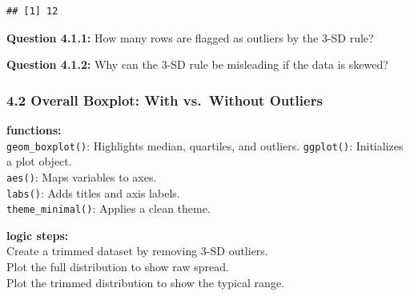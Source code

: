 \documentclass[
]{article}
\newenvironment{Shaded}{\begin{snugshade}}{\end{snugshade}}
\newcommand{\AttributeTok}[1]{\textcolor[rgb]{0.77,0.63,0.00}{#1}}
\newcommand{\ConstantTok}[1]{\textcolor[rgb]{0.00,0.00,0.00}{#1}}
\newcommand{\DecValTok}[1]{\textcolor[rgb]{0.00,0.00,0.81}{#1}}
\newcommand{\FunctionTok}[1]{\textcolor[rgb]{0.00,0.00,0.00}{#1}}
\newcommand{\NormalTok}[1]{#1}
\newcommand{\OtherTok}[1]{\textcolor[rgb]{0.56,0.35,0.01}{#1}}
\newcommand{\SpecialCharTok}[1]{\textcolor[rgb]{0.00,0.00,0.00}{#1}}
\begin{document}
\begin{Shaded}
\end{Shaded}

\begin{verbatim}
## [1] 12
\end{verbatim}

\textbf{Question 4.1.1:} How many rows are flagged as outliers by the
3-SD rule?

\textbf{Question 4.1.2:} Why can the 3-SD rule be misleading if the data
is skewed?

\hypertarget{overall-boxplot-with-vs.-without-outliers}{%
\subsubsection{4.2 Overall Boxplot: With vs.~Without
Outliers}\label{overall-boxplot-with-vs.-without-outliers}}

\textbf{functions:}\\
\texttt{geom\_boxplot()}: Highlights median, quartiles, and outliers.
\texttt{ggplot()}: Initializes a plot object.\\
\texttt{aes()}: Maps variables to axes.\\
\texttt{labs()}: Adds titles and axis labels.\\
\texttt{theme\_minimal()}: Applies a clean theme.

\textbf{logic steps:}\\
Create a trimmed dataset by removing 3-SD outliers.\\
Plot the full distribution to show raw spread.\\
Plot the trimmed distribution to show the typical range.
\end{document}
